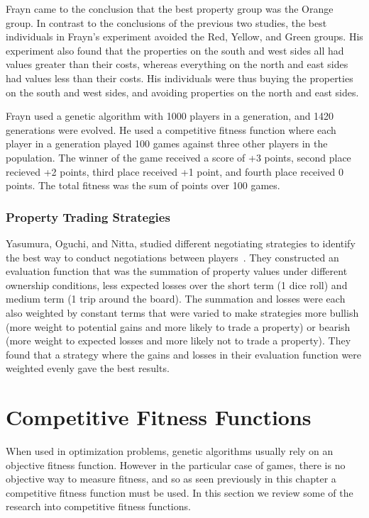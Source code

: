 Frayn came to the conclusion that the best property group was the Orange group.
In contrast to the conclusions of the previous two studies, the best individuals
in Frayn's experiment avoided the Red, Yellow, and Green groups. His experiment
also found that the properties on the south and west sides all had values
greater than their costs, whereas everything on the north and east sides had
values less than their costs. His individuals were thus buying the properties on
the south and west sides, and avoiding properties on the north and east sides.

Frayn used a genetic algorithm with 1000 players in a generation, and
1420 generations were evolved. He used a competitive fitness function where each
player in a generation played 100 games against three other players in the
population. The winner of the game received a score of +3 points, second place
recieved +2 points, third place received +1 point, and fourth place received 0
points. The total fitness was the sum of points over 100 games.

\subsubsection{Property Trading Strategies} \label{3_trading}

Yasumura, Oguchi, and Nitta, studied different negotiating strategies to
identify the best way to conduct negotiations between
players~\cite{Yasumura2001Negotiate}. They constructed an evaluation function
that was the summation of property values under different ownership conditions,
less expected losses over the short term (1 dice roll) and medium term (1 trip
around the board). The summation and losses were each also weighted by constant
terms that were varied to make strategies more bullish (more weight to potential
gains and more likely to trade a property) or bearish (more weight to expected
losses and more likely not to trade a property). They found that a strategy
where the gains and losses in their evaluation function were weighted evenly
gave the best results.

\section{Competitive Fitness Functions}

When used in optimization problems, genetic algorithms usually rely on an
objective fitness function. However in the particular case of games, there is no
objective way to measure fitness, and so as seen previously in this chapter a
competitive fitness function must be used. In this section we review some of the
research into competitive fitness functions.

